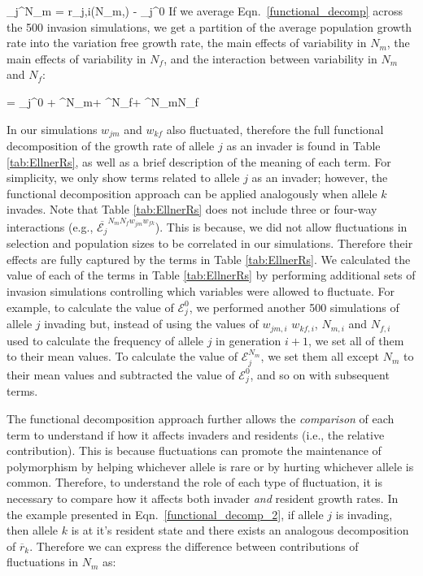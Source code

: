 \documentclass[12pt]{article}
\let\oldequation\equation
\let\oldendequation\endequation
\renewenvironment{equation}
  {\linenomathNonumbers\oldequation}
  {\oldendequation\endlinenomath}
\begin{document}
\begin{equation}
  _{j}^{N_{m}} = r_{j,i}(N_{m},) - _{j}^{0}
\end{equation}
If we average Eqn.~\ref{functional_decomp} across the 500 invasion simulations, we get a partition of the average population growth rate into the variation free growth rate, the main effects of variability in $N_{m}$, the main effects of variability in $N_{f}$, and the interaction between variability in $N_{m}$ and $N_{f}$:

\begin{equation}
    = _{j}^{0} + ^{N_{m}}+ ^{N_{f}}+ ^{N_{m}N_{f}}
   \label{functional_decomp_2}
\end{equation}

In our simulations $w_{jm}$ and $w_{kf}$ also fluctuated, therefore the full functional decomposition of the growth rate of allele $j$ as an invader is found in Table \ref{tab:EllnerRs}, as well as a brief description of the meaning of each term. For simplicity, we only show terms related to allele $j$ as an invader; however, the functional decomposition approach can be applied analogously when allele $k$ invades. Note that Table \ref{tab:EllnerRs} does not include three or four-way interactions (e.g., $\overline{\mathcal{E}_{j}}^{N_{m}N_{f}w_{jm}w_{fk}}$). This is because, we did not allow fluctuations in selection and population sizes to be correlated in our simulations. Therefore their effects are fully captured by the terms in Table \ref{tab:EllnerRs}. We calculated the value of each of the terms in Table \ref{tab:EllnerRs} by performing additional sets of invasion simulations controlling which variables were allowed to fluctuate. For example, to calculate the value of $\mathcal{E}_{j}^{0}$, we performed another 500 simulations of allele $j$ invading but, instead of using the values of $w_{jm,i}$ $w_{kf,i}$, $N_{m,i}$ and $N_{f,i}$ used to calculate the frequency of allele $j$ in generation $i+1$, we set all of them to their mean values. To calculate the value of $\mathcal{E}_{j}^{N_{m}}$, we set them all except $N_{m}$ to their mean values and subtracted the value of $\mathcal{E}_{j}^{0}$, and so on with subsequent terms.

The functional decomposition approach further allows the \textit{comparison} of each term to understand if how it affects invaders and residents (i.e., the relative contribution). This is because fluctuations can promote the maintenance of polymorphism by helping whichever allele is rare or by hurting whichever allele is common. Therefore, to understand the role of each type of fluctuation, it is necessary to compare how it affects both invader \textit{and} resident growth rates. In the example presented in Eqn.~\ref{functional_decomp_2}, if allele $j$ is invading, then allele $k$ is at it's resident state and there exists an analogous decomposition of $\overline{r}_{k}$. Therefore we can express the difference between contributions of fluctuations in $N_{m}$ as:
\end{document}

